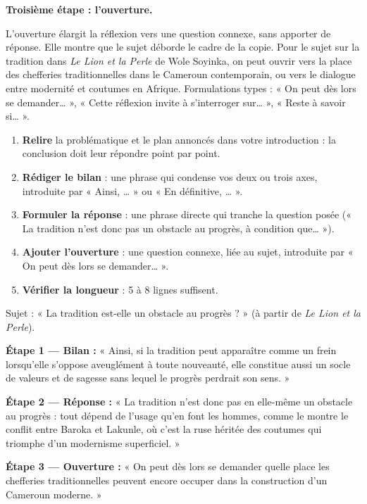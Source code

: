 \documentclass[11pt]{article}
\newcommand{\cle}[1]{{\popxbold\color{popdark}#1}}
\begin{document}
\textbf{Troisième étape : l'ouverture.}\par
L'\cle{ouverture} élargit la réflexion vers une question connexe, sans apporter de réponse. Elle montre que le sujet déborde le cadre de la copie. Pour le sujet sur la tradition dans \emph{Le Lion et la Perle} de Wole Soyinka, on peut ouvrir vers la place des chefferies traditionnelles dans le Cameroun contemporain, ou vers le dialogue entre modernité et coutumes en Afrique. Formulations types : « On peut dès lors se demander… », « Cette réflexion invite à s'interroger sur… », « Reste à savoir si… ».

\begin{methode}
\begin{enumerate}
\item \textbf{Relire} la problématique et le plan annoncés dans votre introduction : la conclusion doit leur répondre point par point.
\item \textbf{Rédiger le bilan} : une phrase qui condense vos deux ou trois axes, introduite par « Ainsi, … » ou « En définitive, … ».
\item \textbf{Formuler la réponse} : une phrase directe qui tranche la question posée (« La tradition n'est donc pas un obstacle au progrès, à condition que… »).
\item \textbf{Ajouter l'ouverture} : une question connexe, liée au sujet, introduite par « On peut dès lors se demander… ».
\item \textbf{Vérifier la longueur} : 5 à 8 lignes suffisent.
\end{enumerate}
\end{methode}

\begin{exemplebox}
Sujet : « La tradition est-elle un obstacle au progrès ? » (à partir de \emph{Le Lion et la Perle}).

\textbf{Étape 1 — Bilan :} « Ainsi, si la tradition peut apparaître comme un frein lorsqu'elle s'oppose aveuglément à toute nouveauté, elle constitue aussi un socle de valeurs et de sagesse sans lequel le progrès perdrait son sens. »

\textbf{Étape 2 — Réponse :} « La tradition n'est donc pas en elle-même un obstacle au progrès : tout dépend de l'usage qu'en font les hommes, comme le montre le conflit entre Baroka et Lakunle, où c'est la ruse héritée des coutumes qui triomphe d'un modernisme superficiel. »

\textbf{Étape 3 — Ouverture :} « On peut dès lors se demander quelle place les chefferies traditionnelles peuvent encore occuper dans la construction d'un Cameroun moderne. »
\end{exemplebox}
\end{document}
